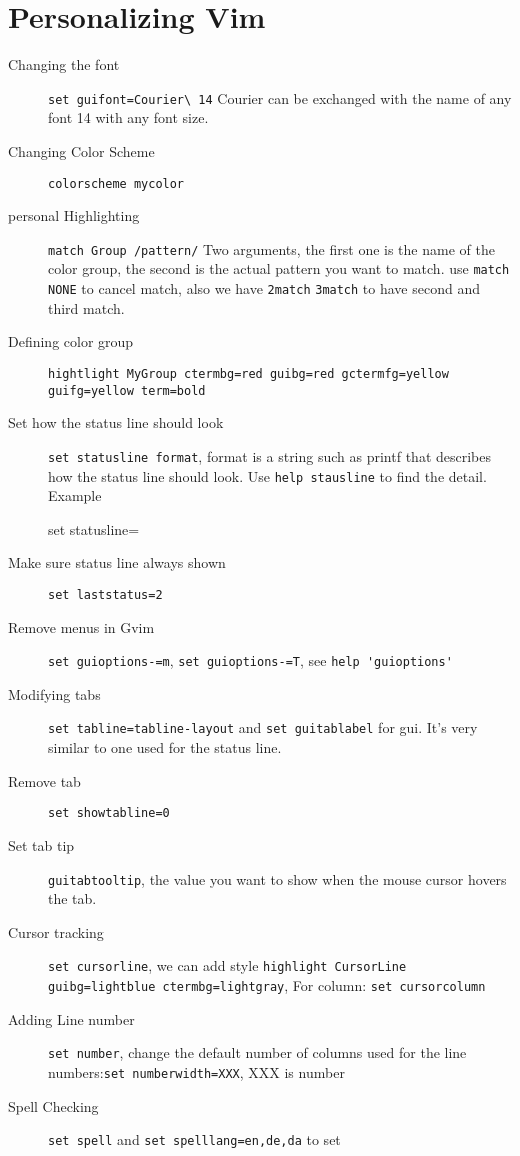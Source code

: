 \documentclass[11pt]{book}
\begin{document}
\chapter{Personalizing Vim}
\begin{description}
\item[Changing the font] \verb|set guifont=Courier\ 14| Courier can be exchanged
with the name of any font 14 with any font size.
\item[Changing Color Scheme] \verb|colorscheme mycolor|
\item[personal Highlighting] \verb|match Group /pattern/| Two arguments, the
first one is the name of the color group, the second is the actual pattern you
want to match. use \verb|match NONE| to cancel match, also we have \verb|2match|
\verb|3match| to have second and third match.
\item[Defining color group]
 \verb|hightlight MyGroup ctermbg=red guibg=red gctermfg=yellow guifg=yellow term=bold|
\item[Set how the status line should look] \verb|set statusline format|, format
is a string such as printf that describes how the status line should look. Use
\verb|help stausline| to find the detail. Example
\begin{spverbatim}
set statusline=%
\end{spverbatim}
 \item[Make sure status line always shown] \verb|set laststatus=2|
\item[Remove menus in Gvim] \verb|set guioptions-=m|, \verb|set guioptions-=T|, 
see \verb|help 'guioptions'|
\item[Modifying tabs]\verb|set tabline=tabline-layout| and \verb|set guitablabel|
 for gui. It's very similar to one used for the status line.
\item[Remove tab] \verb|set showtabline=0|
\item[Set tab tip] \verb|guitabtooltip|, the value you want to show when the
mouse cursor hovers the tab.
\item[Cursor tracking] \verb|set cursorline|, we can add style
 \verb|highlight CursorLine guibg=lightblue ctermbg=lightgray|, For column:
\verb|set cursorcolumn|
\item[Adding Line number] \verb|set number|, change the default number of
columns used for the line numbers:\verb|set numberwidth=XXX|, XXX is number
\item[Spell Checking]\verb|set spell| and \verb|set spelllang=en,de,da| to set

\end{description}
\end{document}
